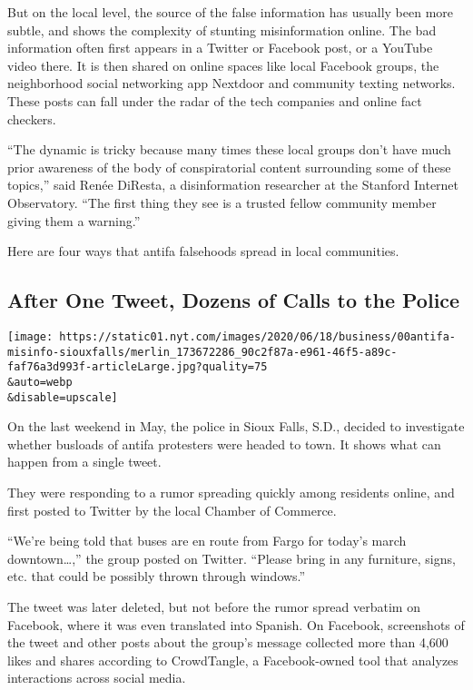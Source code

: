 But on the local level, the source of the false information has usually
been more subtle, and shows the complexity of stunting misinformation
online. The bad information often first appears in a Twitter or Facebook
post, or a YouTube video there. It is then shared on online spaces like
local Facebook groups, the neighborhood social networking app Nextdoor
and community texting networks. These posts can fall under the radar of
the tech companies and online fact checkers.

``The dynamic is tricky because many times these local groups don't have
much prior awareness of the body of conspiratorial content surrounding
some of these topics,'' said Renée DiResta, a disinformation researcher
at the Stanford Internet Observatory. ``The first thing they see is a
trusted fellow community member giving them a warning.''

Here are four ways that antifa falsehoods spread in local communities.

\hypertarget{after-one-tweet-dozens-of-calls-to-the-police}{%
\subsection{After One Tweet, Dozens of Calls to the
Police}\label{after-one-tweet-dozens-of-calls-to-the-police}}

\texttt{[image: https://static01.nyt.com/images/2020/06/18/business/00antifa-misinfo-siouxfalls/merlin\_173672286\_90c2f87a-e961-46f5-a89c-faf76a3d993f-articleLarge.jpg?quality=75\\\&auto=webp\\\&disable=upscale]}

On the last weekend in May, the police in Sioux Falls, S.D., decided to
investigate whether busloads of antifa protesters were headed to town.
It shows what can happen from a single tweet.

They were responding to a rumor spreading quickly among residents
online, and first posted to Twitter by the local Chamber of Commerce.

``We're being told that buses are en route from Fargo for today's march
downtown\ldots{},'' the group posted on Twitter. ``Please bring in any
furniture, signs, etc. that could be possibly thrown through windows.''

The tweet was later deleted, but not before the rumor spread verbatim on
Facebook, where it was even translated into Spanish. On Facebook,
screenshots of the tweet and other posts about the group's message
collected more than 4,600 likes and shares according to CrowdTangle, a
Facebook-owned tool that analyzes interactions across social media.


